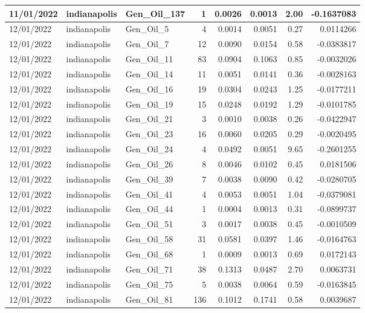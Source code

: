 \documentclass[
  letterpaper,
  DIV=11,
  numbers=noendperiod]{scrartcl}
\begin{document}
\begin{tabular}{l|l|l|r|r|r|r|r}
\hline
11/01/2022 & indianapolis & Gen\_Oil\_137 & 1 & 0.0026 & 0.0013 & 2.00 & -0.1637083\\
\hline
12/01/2022 & indianapolis & Gen\_Oil\_5 & 4 & 0.0014 & 0.0051 & 0.27 & 0.0114266\\
\hline
12/01/2022 & indianapolis & Gen\_Oil\_7 & 12 & 0.0090 & 0.0154 & 0.58 & -0.0383817\\
\hline
12/01/2022 & indianapolis & Gen\_Oil\_11 & 83 & 0.0904 & 0.1063 & 0.85 & -0.0032026\\
\hline
12/01/2022 & indianapolis & Gen\_Oil\_14 & 11 & 0.0051 & 0.0141 & 0.36 & -0.0028163\\
\hline
12/01/2022 & indianapolis & Gen\_Oil\_16 & 19 & 0.0304 & 0.0243 & 1.25 & -0.0177211\\
\hline
12/01/2022 & indianapolis & Gen\_Oil\_19 & 15 & 0.0248 & 0.0192 & 1.29 & -0.0101785\\
\hline
12/01/2022 & indianapolis & Gen\_Oil\_21 & 3 & 0.0010 & 0.0038 & 0.26 & -0.0422947\\
\hline
12/01/2022 & indianapolis & Gen\_Oil\_23 & 16 & 0.0060 & 0.0205 & 0.29 & -0.0020495\\
\hline
12/01/2022 & indianapolis & Gen\_Oil\_24 & 4 & 0.0492 & 0.0051 & 9.65 & -0.2601255\\
\hline
12/01/2022 & indianapolis & Gen\_Oil\_26 & 8 & 0.0046 & 0.0102 & 0.45 & 0.0181506\\
\hline
12/01/2022 & indianapolis & Gen\_Oil\_39 & 7 & 0.0038 & 0.0090 & 0.42 & -0.0280705\\
\hline
12/01/2022 & indianapolis & Gen\_Oil\_41 & 4 & 0.0053 & 0.0051 & 1.04 & -0.0379081\\
\hline
12/01/2022 & indianapolis & Gen\_Oil\_44 & 1 & 0.0004 & 0.0013 & 0.31 & -0.0899737\\
\hline
12/01/2022 & indianapolis & Gen\_Oil\_51 & 3 & 0.0017 & 0.0038 & 0.45 & -0.0010509\\
\hline
12/01/2022 & indianapolis & Gen\_Oil\_58 & 31 & 0.0581 & 0.0397 & 1.46 & -0.0164763\\
\hline
12/01/2022 & indianapolis & Gen\_Oil\_68 & 1 & 0.0009 & 0.0013 & 0.69 & 0.0172143\\
\hline
12/01/2022 & indianapolis & Gen\_Oil\_71 & 38 & 0.1313 & 0.0487 & 2.70 & 0.0063731\\
\hline
12/01/2022 & indianapolis & Gen\_Oil\_75 & 5 & 0.0038 & 0.0064 & 0.59 & -0.0163845\\
\hline
12/01/2022 & indianapolis & Gen\_Oil\_81 & 136 & 0.1012 & 0.1741 & 0.58 & 0.0039687\\

\end{tabular}
\end{document}
